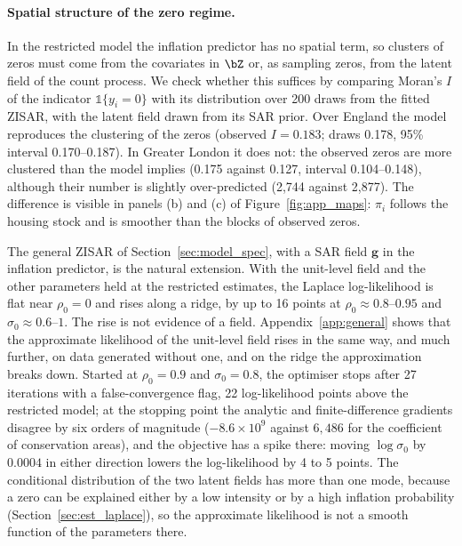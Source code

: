 \paragraph{Spatial structure of the zero regime.}
In the restricted model the inflation predictor has no spatial term, so clusters of zeros must come from the covariates in $\bZ$ or, as sampling zeros, from the latent field of the count process.
We check whether this suffices by comparing Moran's $I$ of the indicator $\mathbb{1}\{y_i = 0\}$ with its distribution over 200 draws from the fitted ZISAR, with the latent field drawn from its SAR prior.
Over England the model reproduces the clustering of the zeros (observed $I = 0.183$; draws 0.178, 95\% interval 0.170--0.187).
In Greater London it does not: the observed zeros are more clustered than the model implies (0.175 against 0.127, interval 0.104--0.148), although their number is slightly over-predicted (2{,}744 against 2{,}877).
The difference is visible in panels (b) and (c) of Figure~\ref{fig:app_maps}: $\hat\pi_i$ follows the housing stock and is smoother than the blocks of observed zeros.

The general ZISAR of Section~\ref{sec:model_spec}, with a SAR field $\mathbf{g}$ in the inflation predictor, is the natural extension.
With the unit-level field and the other parameters held at the restricted estimates, the Laplace log-likelihood is flat near $\rho_0 = 0$ and rises along a ridge, by up to 16 points at $\rho_0 \approx 0.8$--$0.95$ and $\sigma_0 \approx 0.6$--$1$.
The rise is not evidence of a field.
Appendix~\ref{app:general} shows that the approximate likelihood of the unit-level field rises in the same way, and much further, on data generated without one, and on the ridge the approximation breaks down.
Started at $\rho_0 = 0.9$ and $\sigma_0 = 0.8$, the optimiser stops after 27 iterations with a false-convergence flag, 22 log-likelihood points above the restricted model; at the stopping point the analytic and finite-difference gradients disagree by six orders of magnitude ($-8.6\times10^{9}$ against $6{,}486$ for the coefficient of conservation areas), and the objective has a spike there: moving $\log\sigma_0$ by $0.0004$ in either direction lowers the log-likelihood by 4 to 5 points.
The conditional distribution of the two latent fields has more than one mode, because a zero can be explained either by a low intensity or by a high inflation probability (Section~\ref{sec:est_laplace}), so the approximate likelihood is not a smooth function of the parameters there.

